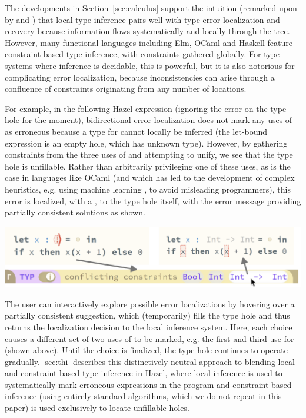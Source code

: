 % 

The developments in Section~\ref{sec:calculus} support the intuition (remarked upon by \citet{Localinf} and \citet{BidirTyping}) that local type inference pairs well with type error localization and recovery because information flows systematically and locally through the tree. However, many functional languages including Elm, OCaml and Haskell feature constraint-based type inference, with constraints gathered globally. For type systems where inference is decidable, this is powerful, but it is also notorious for complicating error localization, because inconsistencies can arise through a confluence of constraints originating from any number of locations. 

For example, in the following Hazel expression (ignoring the error on the type hole for the moment), bidirectional error localization 
does not mark any uses of  as erroneous because a type for  cannot locally be inferred (the let-bound expression is an empty hole, which has unknown type). However, by gathering constraints from the three uses of  and attempting to unify, we see that the type hole is unfillable. Rather than arbitrarily privileging one of these uses, as is the case in languages like OCaml (and which has led to the development of complex heuristics, e.g. using machine learning \cite{SeidelBlame}, to avoid misleading programmers), this error is localized, with a \li{!}, to the type hole itself, with the error message providing partially consistent solutions as shown.
\\
\begin{center}
    \includegraphics[scale=0.4]{images/figSugg.png}
\end{center}


The user can interactively explore possible error localizations by hovering over a partially consistent suggestion, which (temporarily) fills the type hole and thus returns the localization decision to the local inference system.
Here, each choice causes a different set of two uses of  to be marked, e.g. the first and third use for  (shown above). Until the choice is finalized, the type hole continues to operate gradually.
\cref{sec:thi} describes this distinctively neutral approach to blending local and constraint-based type inference in Hazel, where local inference is used to systematically mark erroneous expressions in the program and constraint-based inference (using entirely standard algorithms, which we do not repeat in this paper) is used exclusively to locate unfillable holes.
